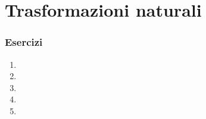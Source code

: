 \section{Trasformazioni naturali}

\subsubsection*{Esercizi}
\begin{enumerate}
    \item 
    \item 
    \item 
    \item 
    \item 
\end{enumerate}
